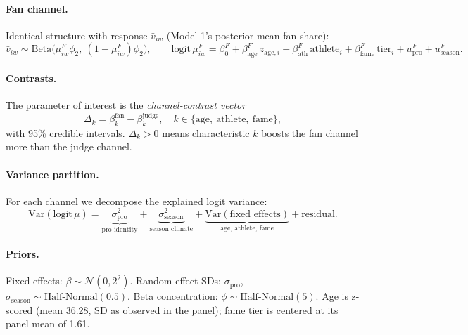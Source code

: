 \documentclass{article}
\begin{document}
\paragraph{Fan channel.} Identical structure with response $\bar v_{iw}$ (Model 1's posterior mean fan share):
\begin{equation}
\bar v_{iw} \sim \mathrm{Beta}\big(\mu^F_{iw}\phi_2,\ (1-\mu^F_{iw})\phi_2\big), \qquad \mathrm{logit}\,\mu^F_{iw} = \beta^F_0 + \beta^F_{\text{age}}\,z_{\text{age},i} + \beta^F_{\text{ath}}\,\mathrm{athlete}_i + \beta^F_{\text{fame}}\,\mathrm{tier}_i + u^F_{\text{pro}} + u^F_{\text{season}}.
\label{eq:m3-fan}
\end{equation}

\paragraph{Contrasts.} The parameter of interest is the \emph{channel-contrast vector}
\begin{equation}
\Delta_k = \beta^{\text{fan}}_k - \beta^{\text{judge}}_k, \quad k \in \{\text{age},\ \text{athlete},\ \text{fame}\},
\label{eq:delta}
\end{equation}
with 95\% credible intervals. $\Delta_k > 0$ means characteristic $k$ boosts the fan channel more than the judge channel.

\paragraph{Variance partition.} For each channel we decompose the explained logit variance:
\begin{equation}
\mathrm{Var}(\mathrm{logit}\,\mu) = \underbrace{\sigma^2_{\text{pro}}}_{\text{pro identity}} + \underbrace{\sigma^2_{\text{season}}}_{\text{season climate}} + \underbrace{\text{Var}(\text{fixed effects})}_{\text{age, athlete, fame}} + \text{residual}.
\label{eq:varpart}
\end{equation}

\paragraph{Priors.} Fixed effects: $\beta \sim \mathcal{N}(0, 2^2)$. Random-effect SDs: $\sigma_{\text{pro}}$, $\sigma_{\text{season}} \sim \mathrm{Half\text{-}Normal}(0.5)$. Beta concentration: $\phi \sim \mathrm{Half\text{-}Normal}(5)$. Age is z-scored (mean 36.28, SD as observed in the panel); fame tier is centered at its panel mean of 1.61.
\end{document}
